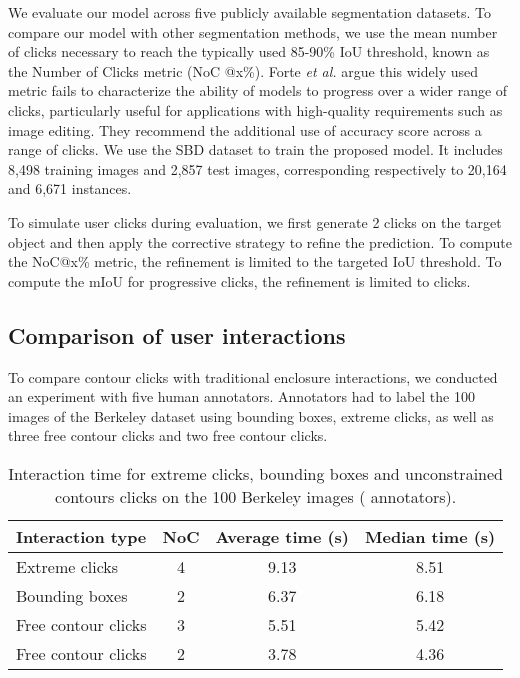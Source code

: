 \documentclass[letterpaper, 10 pt, conference]{ieeeconf}
\begin{document}
We evaluate our model across five publicly available segmentation datasets. To compare our model with other segmentation methods, we use the mean number of clicks necessary to reach the typically used 85-90\% IoU threshold, known as the Number of Clicks metric (NoC @x\%). Forte \textit{et al.} \cite{forte20} argue this widely used metric fails to characterize the ability of models to progress over a wider range of clicks, particularly useful for applications with high-quality requirements such as image editing. They recommend the additional use of accuracy score across a range of clicks.
We use the SBD dataset \cite{bharath11} to train the proposed model. It includes 8,498 training images and 2,857 test images, corresponding respectively to 20,164 and 6,671 instances.

To simulate user clicks during evaluation, we first generate 2 clicks on the target object and then apply the corrective strategy to refine the prediction. To compute the NoC@x\% metric, the refinement is limited to the targeted IoU threshold. To compute the mIoU for progressive  clicks, the refinement is limited to  clicks.



\subsection{Comparison of user interactions}
 To compare contour clicks with traditional enclosure interactions, we conducted an experiment with five human annotators. Annotators had to label the 100 images of the Berkeley dataset \cite{martin01} using bounding boxes, extreme clicks, as well as three free contour clicks and two free contour clicks.
\begin{table}
    \centering
    \begin{tabular}{lccc}
        \hline
       Interaction type &
       NoC &
       Average time (s) &
       Median time (s) \\
        \hline
        \hline
        Extreme clicks & 4 & 9.13 & 8.51 \\
        Bounding boxes & 2 & 6.37 & 6.18 \\
        Free contour clicks & 3 & 5.51 & 5.42 \\
        Free contour clicks & 2 & 3.78 & 4.36 \\
        \hline
    \end{tabular}
    \caption{Interaction time for extreme clicks, bounding boxes and unconstrained contours clicks on the 100 Berkeley images \cite{martin01} ( annotators).}
    \label{tab:time_comparison}
\end{table}
\end{document}
